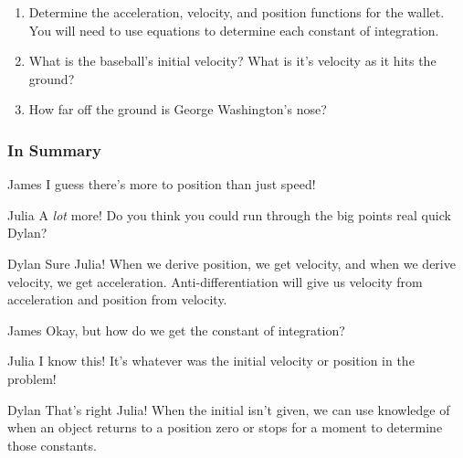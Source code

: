 \documentclass{ximera}
\begin{document}
\begin{enumerate}
\begin{enumerate}
\item{Determine the acceleration, velocity, and position functions for the wallet. You will need to use equations to determine each constant of integration.}
\item{What is the baseball's initial velocity? What is it's velocity as it hits the ground?}
\item{How far off the ground is George Washington's nose?}
\end{enumerate}
\end{enumerate}

\subsubsection{In Summary}
\begin{dialogue}
\item[James] I guess there's more to position than just speed!
\item[Julia] A \textit{lot} more! Do you think you could run through the big points real quick Dylan?
\item[Dylan] Sure Julia! When we derive position, we get velocity, and when we derive velocity, we get acceleration. Anti-differentiation will give us velocity from acceleration and position from velocity.
\item[James] Okay, but how do we get the constant of integration?
\item[Julia] I know this! It's whatever was the initial velocity or position in the problem!
\item[Dylan] That's right Julia! When the initial isn't given, we can use knowledge of when an object returns to a position zero or stops for a moment to determine those constants.
\end{dialogue}
\pagebreak
\end{document}
